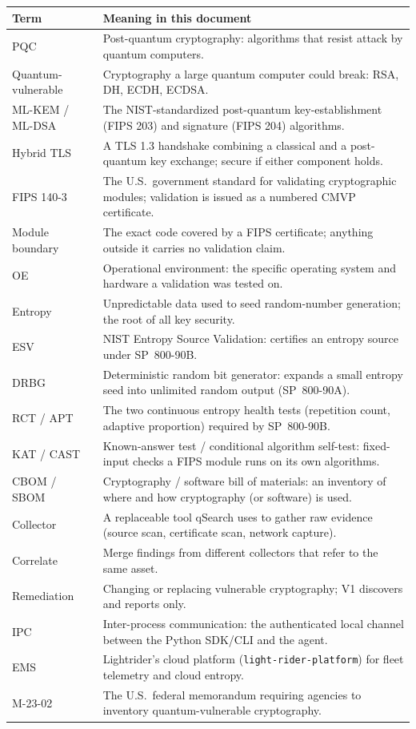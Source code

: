 \documentclass[10pt]{article}
\newcommand{\code}[1]{\texttt{\small #1}}
\begin{document}
\begin{small}
\begin{tabularx}{\textwidth}{@{}lL@{}}
\toprule
\textbf{Term} & \textbf{Meaning in this document} \\
\midrule
PQC & Post-quantum cryptography: algorithms that resist attack by quantum computers. \\
Quantum-vulnerable & Cryptography a large quantum computer could break: RSA, DH, ECDH,
  ECDSA. \\
ML-KEM / ML-DSA & The NIST-standardized post-quantum key-establishment (FIPS 203) and
  signature (FIPS 204) algorithms. \\
Hybrid TLS & A TLS 1.3 handshake combining a classical and a post-quantum key exchange;
  secure if either component holds. \\
FIPS 140-3 & The U.S.\ government standard for validating cryptographic modules;
  validation is issued as a numbered CMVP certificate. \\
Module boundary & The exact code covered by a FIPS certificate; anything outside it
  carries no validation claim. \\
OE & Operational environment: the specific operating system and hardware a validation
  was tested on. \\
Entropy & Unpredictable data used to seed random-number generation; the root of all key
  security. \\
ESV & NIST Entropy Source Validation: certifies an entropy source under SP~800-90B. \\
DRBG & Deterministic random bit generator: expands a small entropy seed into unlimited
  random output (SP~800-90A). \\
RCT / APT & The two continuous entropy health tests (repetition count, adaptive
  proportion) required by SP~800-90B. \\
KAT / CAST & Known-answer test / conditional algorithm self-test: fixed-input checks a
  FIPS module runs on its own algorithms. \\
CBOM / SBOM & Cryptography / software bill of materials: an inventory of where and how
  cryptography (or software) is used. \\
Collector & A replaceable tool qSearch uses to gather raw evidence (source scan,
  certificate scan, network capture). \\
Correlate & Merge findings from different collectors that refer to the same asset. \\
Remediation & Changing or replacing vulnerable cryptography; V1 discovers and reports
  only. \\
IPC & Inter-process communication: the authenticated local channel between the Python
  SDK/CLI and the agent. \\
EMS & Lightrider's cloud platform (\code{light-rider-platform}) for fleet telemetry and
  cloud entropy. \\
M-23-02 & The U.S.\ federal memorandum requiring agencies to inventory quantum-vulnerable
  cryptography. \\
\bottomrule
\end{tabularx}
\end{small}
\end{document}
